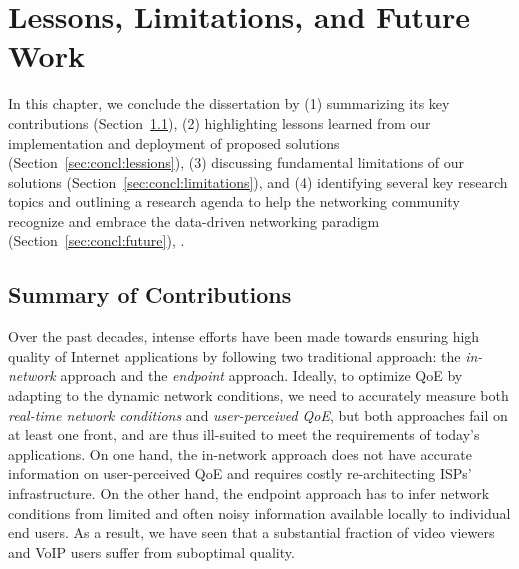 \chapter{Lessons, Limitations, and Future Work}
\label{ch:concl}


In this chapter, we conclude the dissertation by 
(1) summarizing its key contributions (Section~\ref{sec:concl:contributions}), 
(2) highlighting lessons learned from our implementation and 
deployment of proposed solutions (Section~\ref{sec:concl:lessions}), 
(3) discussing fundamental limitations of our solutions (Section~\ref{sec:concl:limitations}), and
(4) identifying several key research topics and outlining a 
research agenda to help the networking community recognize 
and embrace the data-driven networking paradigm (Section~\ref{sec:concl:future}), .

\section{Summary of Contributions}
\label{sec:concl:contributions}

Over the past decades, intense efforts have been made towards
ensuring high quality of Internet applications by following two 
traditional approach: the {\em in-network} approach and 
the {\em endpoint} approach.
Ideally, to optimize QoE by adapting to the dynamic network conditions,
we need to accurately measure both {\em real-time network 
conditions} and {\em user-perceived QoE}, but both approaches fail
on at least one front, and are thus ill-suited to meet the 
requirements of today's applications. 
On one hand, the in-network approach does not have accurate 
information on user-perceived QoE and requires costly 
re-architecting ISPs' infrastructure.
On the other hand, the endpoint approach has to infer network
conditions from limited and often noisy information available locally
to individual end users.
As a result, we have seen that a substantial fraction of video 
viewers and VoIP users suffer from suboptimal quality.

